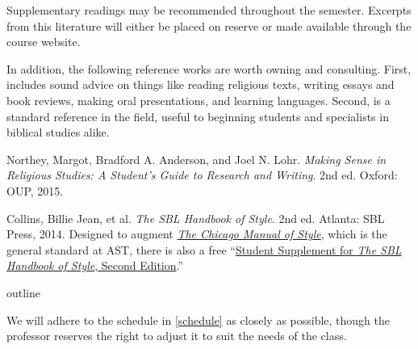 \documentclass[titlepage]{article}
\begin{document}
Supplementary readings may be recommended throughout the semester.
Excerpts from this literature will either be placed on reserve or made
available through the course website.

In addition, the following reference works are worth owning and
consulting. First, \cite{rlgs} includes sound advice on things like
reading religious texts, writing essays and book reviews, making oral
presentations, and learning languages. Second, \cite{sbl2} is a standard
reference in the field, useful to beginning students and specialists in
biblical studies alike.

\begingroup
\renewcommand{\section}[2]{}%
\begin{thebibliography}{1}%

	 Northey, Margot, Bradford A. Anderson, and Joel N. Lohr.
	\emph{Making Sense in Religious Studies: A Student's Guide to Research and Writing}. 2nd ed.
	Oxford: OUP, 2015. %

	 Collins, Billie Jean, et al.
	\emph{The SBL Handbook of Style}. 2nd ed.
	Atlanta: SBL Press, 2014. %
	Designed to augment \href{http://www.chicagomanualofstyle.org/home.html}{\emph{The Chicago Manual of Style}},
	which is the general standard at AST, there is also a free
	“\href{https://www.sbl-site.org/assets/pdfs/pubs/SBLHSsupp2015-02.pdf}{Student Supplement for \emph{The SBL Handbook of Style}, Second Edition}.”

\end{thebibliography}
\endgroup

\section{Course Outline}
\label{outline}

We will adhere to the schedule in \autoref{schedule} as closely as
possible, though the professor reserves the right to adjust it to suit
the needs of the class.

\newcommand\HBFB[1]{\cite[#1]{hbfb}}
\end{document}
